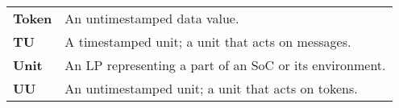 \begin{tabularx}{\textwidth}{lX}
\textbf{Token} & An untimestamped data value. \\
\textbf{TU} & A timestamped unit; a unit that acts on messages. \\
\textbf{Unit} & An LP representing a part of an SoC or its environment. \\
\textbf{UU} & An untimestamped unit; a unit that acts on tokens. \\
\end{tabularx}
